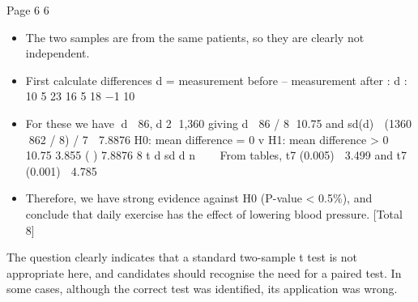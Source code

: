 \documentclass[a4paper,12pt]{article}
\begin{document}
\newpage
Page 6
6 
\begin{itemize}
\item The two samples are from the same patients, so they are clearly not
independent. 
\item First calculate differences d = measurement before – measurement after :
  d : 10 5 23 16 5 18 −1 10
\item For these we have d  86,d 2 1,360
giving d  86 / 8 10.75 and sd(d)  (1360 862 / 8) / 7  7.8876
H0: mean difference = 0 v H1: mean difference > 0
10.75 3.855
( ) 7.8876 8
t d
sd d n
  
From tables, t7 (0.005)  3.499 and t7 (0.001)  4.785
\item Therefore, we have strong evidence against H0 (P-value < 0.5\%), and
conclude that daily exercise has the effect of lowering blood pressure. 
[Total 8]
\end{itemize}
The question clearly indicates that a standard two-sample t
test is not appropriate here, and candidates should recognise the need for a paired test. In
some cases, although the correct test was identified, its application was wrong.
\end{document}
